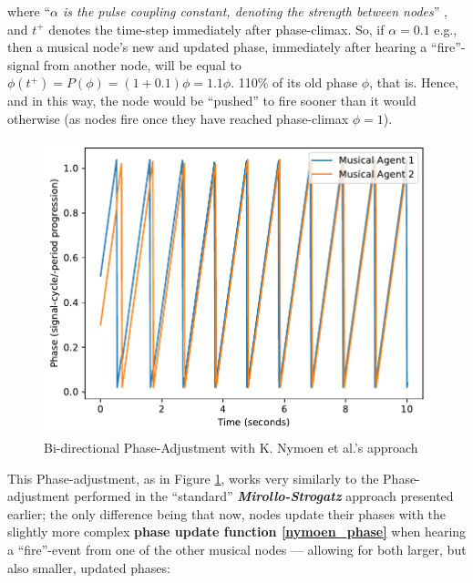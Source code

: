 			where ``\textit{$\alpha$ is the pulse coupling constant, denoting the strength between nodes}'' \cite{nymoen_synch}, and $t^+$ denotes the time-step immediately after phase-climax. So, if $\alpha = 0.1$ e.g., then a musical node's new and updated phase, immediately after hearing a ``fire''-signal from another node, will be equal to $\phi(t^+) = P(\phi) = (1 + 0.1)\phi = 1.1\phi$. 110\% of its old phase $\phi$, that is. Hence, and in this way, the node would be ``pushed'' to fire sooner than it would otherwise (as nodes fire once they have reached phase-climax $\phi=1$).
				
			
			
			
			
			
			\begin{figure}[h]
				\centering
				\includegraphics[width=0.9\linewidth]{Assets/Figures/NymoenPhaseAdjustment.pdf}
				\caption{Bi-directional Phase-Adjustment with K. Nymoen et al.'s approach}
				\label{fig:nymoen_phase}
			\end{figure}
			
			This Phase-adjustment, as in Figure \ref{fig:nymoen_phase}, works very similarly to the Phase-adjustment performed in the ``standard'' \textbf{\textit{Mirollo-Strogatz}} approach presented earlier; the only difference being that now, nodes update their phases with the slightly more complex \textbf{phase update function \eqref{nymoen_phase}} when hearing a ``fire''-event from one of the other musical nodes — allowing for both larger, but also smaller, updated phases:
			

